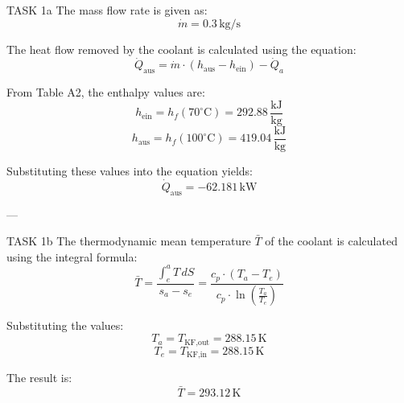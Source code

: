 TASK 1a  
The mass flow rate is given as:  
\[
\dot{m} = 0.3 \, \text{kg/s}
\]  

The heat flow removed by the coolant is calculated using the equation:  
\[
\dot{Q}_{\text{aus}} = \dot{m} \cdot (h_{\text{aus}} - h_{\text{ein}}) - \dot{Q}_a
\]  

From Table A2, the enthalpy values are:  
\[
h_{\text{ein}} = h_f(70^\circ\text{C}) = 292.88 \, \frac{\text{kJ}}{\text{kg}}
\]  
\[
h_{\text{aus}} = h_f(100^\circ\text{C}) = 419.04 \, \frac{\text{kJ}}{\text{kg}}
\]  

Substituting these values into the equation yields:  
\[
\dot{Q}_{\text{aus}} = -62.181 \, \text{kW}
\]  

---

TASK 1b  
The thermodynamic mean temperature \( \bar{T} \) of the coolant is calculated using the integral formula:  
\[
\bar{T} = \frac{\int_{e}^{a} T \, dS}{s_a - s_e} = \frac{c_p \cdot (T_a - T_e)}{c_p \cdot \ln \left( \frac{T_a}{T_e} \right)}
\]  

Substituting the values:  
\[
T_a = T_{\text{KF,out}} = 288.15 \, \text{K}
\]  
\[
T_e = T_{\text{KF,in}} = 288.15 \, \text{K}
\]  

The result is:  
\[
\bar{T} = 293.12 \, \text{K}
\]  